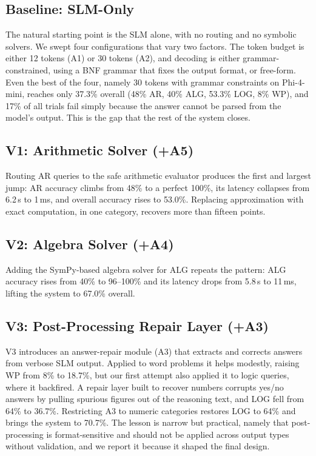 \documentclass[journal]{IEEEtai}
\begin{document}
\subsection{Baseline: SLM-Only}

The natural starting point is the SLM alone, with no routing and no symbolic solvers. We swept four configurations that vary two factors. The token budget is either 12 tokens (A1) or 30 tokens (A2), and decoding is either grammar-constrained, using a BNF grammar that fixes the output format, or free-form. Even the best of the four, namely 30 tokens with grammar constraints on Phi-4-mini, reaches only 37.3\% overall (48\% AR, 40\% ALG, 53.3\% LOG, 8\% WP), and 17\% of all trials fail simply because the answer cannot be parsed from the model's output. This is the gap that the rest of the system closes.

\subsection{V1: Arithmetic Solver (+A5)}

Routing AR queries to the safe arithmetic evaluator produces the first and largest jump: AR accuracy climbs from 48\% to a perfect 100\%, its latency collapses from 6.2\,s to 1\,ms, and overall accuracy rises to 53.0\%. Replacing approximation with exact computation, in one category, recovers more than fifteen points.

\subsection{V2: Algebra Solver (+A4)}

Adding the SymPy-based algebra solver for ALG repeats the pattern: ALG accuracy rises from 40\% to 96--100\% and its latency drops from 5.8\,s to 11\,ms, lifting the system to 67.0\% overall.

\subsection{V3: Post-Processing Repair Layer (+A3)}

V3 introduces an answer-repair module (A3) that extracts and corrects answers from verbose SLM output. Applied to word problems it helps modestly, raising WP from 8\% to 18.7\%, but our first attempt also applied it to logic queries, where it backfired. A repair layer built to recover numbers corrupts yes/no answers by pulling spurious figures out of the reasoning text, and LOG fell from 64\% to 36.7\%. Restricting A3 to numeric categories restores LOG to 64\% and brings the system to 70.7\%. The lesson is narrow but practical, namely that post-processing is format-sensitive and should not be applied across output types without validation, and we report it because it shaped the final design.
\end{document}
